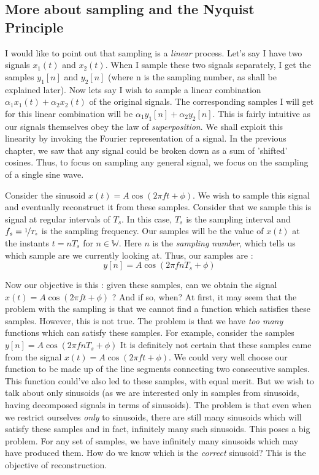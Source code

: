 \documentclass{article}
\theoremstyle{definition}
\begin{document}
	 \subsection{More about sampling and the Nyquist Principle}
	 I would like to point out that sampling is a \textit{linear} process. Let's say I have two signals $x_1(t)$ and $x_2(t)$. When I sample these two signals separately, I get the samples $y_1[n]$ and $y_2[n]$ (where n is the sampling number, as shall be explained later). Now lets say I wish to sample a linear combination $\alpha_1 x_1(t) + \alpha_2 x_2(t)$ of the original signals. The corresponding samples I will get for this linear combination will be $\alpha_1 y_1[n] + \alpha_2 y_2[n]$. This is fairly intuitive as our signals themselves obey the law of \textit{superposition}. We shall exploit this linearity by invoking the Fourier representation of a signal. In the previous chapter, we saw that any signal could be broken down as a sum of 'shifted' cosines. Thus, to focus on sampling any general signal, we focus on the sampling of a single sine wave. \smallskip
	 
	Consider the sinusoid $x(t) = A\cos(2\pi ft + \phi)$. We wish to sample this signal and eventually reconstruct it from these samples. Consider that we sample this is signal at regular intervals of $T_s$. In this case, $T_s$ is the sampling interval and $f_s = \nicefrac{1}{T_s}$ is the sampling frequency. Our samples will be the value of $x(t)$ at the instants $t = nT_s$ for $n \in \mathbb{W}$. Here $n$ is the \textit{sampling number}, which tells us which sample are we currently looking at. Thus, our samples are :  
	\[
		y[n] = A\cos(2\pi f nT_s + \phi)
	\]
	
	Now our objective is this : given these samples, can we obtain the signal $x(t) = A\cos(2\pi ft + \phi)$ ? And if so, when? At first, it may seem that the problem with the sampling is that we cannot find a function which satisfies these samples. However, this is not true. The problem is that we have \textit{too many} functions which can satisfy these samples. For example, consider the samples $y[n] = A\cos(2\pi f n T_s + \phi)$ It is definitely not certain that these samples came from the signal $x(t) = A\cos(2\pi ft + \phi)$. We could very well choose our function to be made up of the line segments connecting two consecutive samples. This function could've also led to these samples, with equal merit. But we wish to talk about only sinusoids (as we are interested only in samples from sinusoids, having decomposed signals in terms of sinusoids). The problem is that even when we restrict ourselves \textit{only} to sinusoids, there are still many sinusoids which will satisfy these samples and in fact, infinitely many such sinusoids. This poses a big problem. For any set of samples, we have infinitely many sinusoids which may have produced them. How do we know which is the \textit{correct} sinusoid? This is the objective of reconstruction.  \smallskip
	
\end{document}
